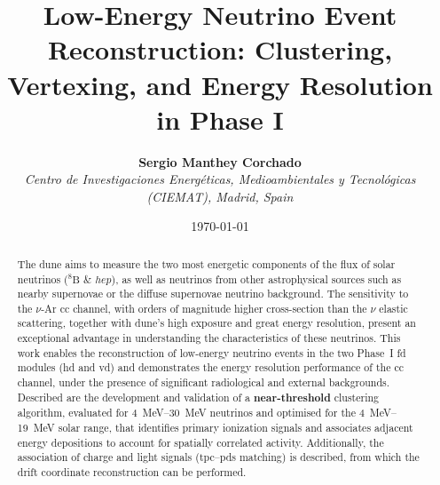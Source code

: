 \title{Low-Energy Neutrino Event Reconstruction: Clustering, Vertexing, and Energy Resolution in Phase I}

\newcommand{\ciemat}{\small\textit{Centro de Investigaciones Energéticas, Medioambientales y Tecnológicas (CIEMAT), Madrid, Spain}}

\author{\textbf{Sergio Manthey Corchado}\\
    \ciemat\\
}

\date{\today}
\maketitle
\begin{abstract}
    \normalsize
    The \gls{dune} aims to measure the two most energetic components of the flux of solar neutrinos ($^{8}\text{B}$ \& $hep$), as well as neutrinos from other astrophysical sources such as nearby supernovae or the diffuse supernovae neutrino background. The sensitivity to the $\nu$-Ar \gls{cc} channel, with orders of magnitude higher cross-section than the $\nu$ elastic scattering, together with \gls{dune}'s high exposure and great energy resolution, present an exceptional advantage in understanding the characteristics of these neutrinos. This work enables the reconstruction of low-energy neutrino events in the two Phase~I \gls{fd} modules (\gls{hd} and \gls{vd}) and demonstrates the energy resolution performance of the \gls{cc} channel, under the presence of significant radiological and external backgrounds. Described are the development and validation of a \textbf{near-threshold} clustering algorithm, evaluated for \qtyrange{4}{30}{\mega\electronvolt} neutrinos and optimised for the \qtyrange{4}{19}{\mega\electronvolt} solar range, that identifies primary ionization signals and associates adjacent energy depositions to account for spatially correlated activity. Additionally, the association of charge and light signals (\gls{tpc}--\gls{pds} matching) is described, from which the drift coordinate reconstruction can be performed.\\
    

\end{abstract}
